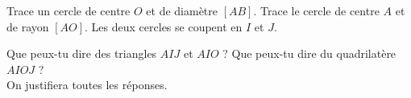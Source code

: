 Trace un cercle de centre $O$ et de diamètre $[AB]$. Trace le cercle
 de centre $A$ et de rayon $[AO]$. Les deux cercles se coupent en $I$
 et $J$.
\par Que peux-tu dire des triangles $AIJ$ et $AIO$ ? Que peux-tu dire
du quadrilatère $AIOJ$ ?\\On justifiera toutes les réponses.